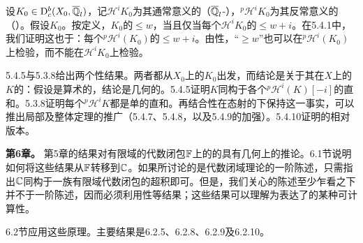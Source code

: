 设$K_0\in\mathrm{D}_c^b(X_0,\overline{\mathbb Q}_l)$，记$\mathcal H^iK_0$为其通常意义的（$\overline{\mathbb Q}_l$-），${}^p\mathcal H^iK_0$为其反常意义的（）。假设$K_0$。按定义，$K_0$的$\leq w$，当且仅当每个$\mathcal H^iK_0$的$\leq w+i$。在5.4.1中，我们证明这也于：每个${}^p\mathcal H^i(K_0)$的$\leq w+i$。由性，“$\geq w$”也可以在${}^p\mathcal H^i(K_0)$上检验，而不能在$\mathcal H^iK_0$上检验。

5.4.5与5.3.8给出两个性结果。两者都从$X_0$上的$K_0$出发，而结论是关于其在$X$上的$K$的：假设是算术的，结论是几何的。5.4.5证明$K$同构于各个${}^p\mathcal H^i(K)[-i]$的直和。5.3.8证明每个${}^p\mathcal H^iK$都是单的直和。再结合性在态射的下保持这一事实，可以推出局部及整体定理的推广（5.4.7、5.4.8，以及5.4.9的加强）。5.4.10证明的相对版本。

\par\medskip\noindent\textbf{第6章。} 第5章的结果对有限域的代数闭包$\mathbb F$上的的具有几何上的推论。6.1节说明如何将这些结果从$\mathbb F$转移到$\mathbb C$。如果所讨论的是代数闭域理论的一阶陈述，只需指出$\mathbb C$同构于一族有限域代数闭包的超积即可。但是，我们关心的陈述至少乍看之下并不于一阶陈述，因而必须利用性等结果；这些结果可以理解为表达了的某种可计算性。

6.2节应用这些原理。主要结果是6.2.5、6.2.8、6.2.9及6.2.10。


